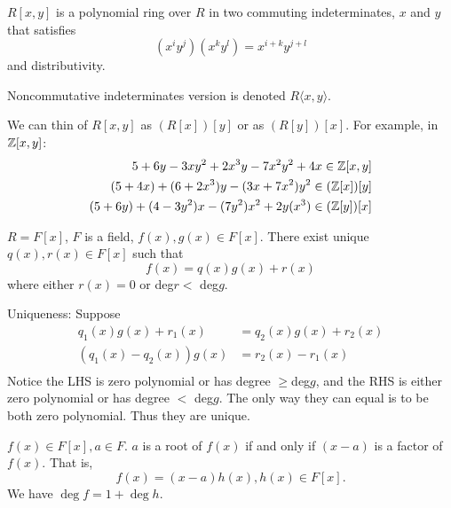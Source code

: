 \documentclass[class=article,crop=false]{standalone}
\begin{document}
\begin{eg}[]
	$ R[x,y]$ is a polynomial ring over  $ R$ in two commuting indeterminates,  $ x$ and  $ y$ that satisfies
	\[
		(x^{i} y^{j}) (x^{k} y^{l}) = x^{i+k} y ^{j+l}
	\] and distributivity.

	\begin{note}[]
	Noncommutative indeterminates version is denoted $ R\langle x,y \rangle$.
	\end{note}

	We can thin of $ R[x,y]$ as  $ (R[x])[y]$ or as  $ (R[y])[x]$. For example, in  $ \mathbb{Z}[x,y]$:
	\begin{align*}
		5+6y-3xy^2+2x^3y-7x^2y^2+4x \in \mathbb{Z}[x,y]\\
		(5+4x)+ (6+2x^3)y-(3x+7x^2)y^2 \in (\mathbb{Z}[x])[y]\\
		(5+6y) + (4-3y^2)x - (7y^2)x^2 + 2y(x^3) \in (\mathbb{Z}[y])[x]\\
	\end{align*}
\end{eg}

\begin{thm}[]
	$ R=F[x]$,  $ F$ is a field, $ f(x), g(x) \in F[x]$. There exist unique $ q(x), r(x) \in F[x]$ such that 
	\[
		f(x) = q(x)g(x) + r(x)
	\] 
	where either $ r(x) =0$ or deg$r <$ deg$g $.
\end{thm}

\begin{prf}
Uniqueness: Suppose
\begin{align*}
	q_1(x)g(x) + r_1(x) &= q_2 (x) g(x) + r_2(x) \\
	(q_1(x) - q_2(x)) g(x)&= r_2(x) - r_1(x) \\
\end{align*}
Notice the LHS is zero polynomial or has degree $ \geq $deg$g $, and the RHS is either zero polynomial or has degree  $ <$ deg$g $. The only way they can equal is to be both zero polynomial. Thus they are unique. 
\end{prf}

\begin{thm}
	$ f(x) \in F[x], a \in F$. $ a$ is a root of  $ f(x) $ if and only if  $ (x-a)$ is a factor of  $ f(x)$. That is,
	 \[
		 f(x) = (x-a)h(x), h(x) \in F[x]
	.\] 
	We have $ \deg f = 1 + \deg h$.
\end{thm}
\end{document}
